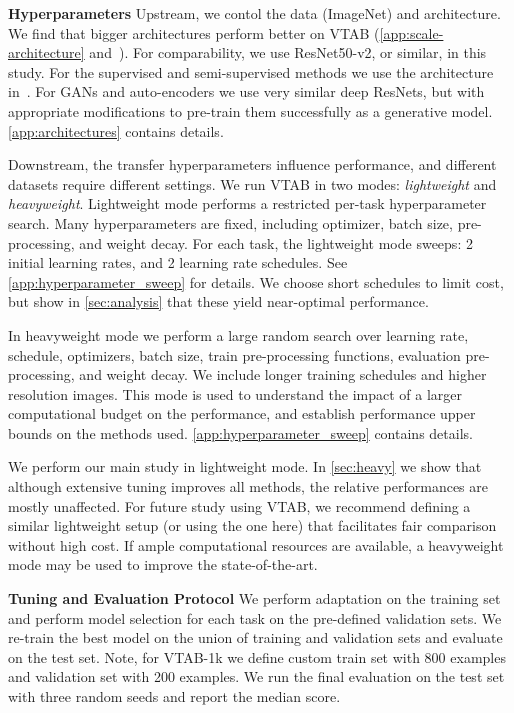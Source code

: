 \textbf{Hyperparameters}\quad
Upstream, we contol the data (ImageNet) and architecture. We find that bigger architectures perform better on VTAB (\ref{app:scale-architecture} and~\citet{kolesnikov2019revisiting}).
For comparability, we use ResNet50-v2, or similar, in this study. For the supervised and semi-supervised methods we use the architecture in~\citet{he2016identity}.
For GANs and auto-encoders we use very similar deep ResNets, but with appropriate modifications to pre-train them successfully as a generative model.
\ref{app:architectures} contains details.

Downstream, the transfer hyperparameters influence performance, and different datasets require different settings. We run VTAB in two modes: \emph{lightweight} and \emph{heavyweight}.
Lightweight mode performs a restricted per-task hyperparameter search. Many hyperparameters are fixed, including optimizer, batch size, pre-processing, and weight decay. For each task, the lightweight mode sweeps: 2 initial learning rates, and 2 learning rate schedules. See \ref{app:hyperparameter_sweep} for details. We choose short schedules to limit cost, but show in \ref{sec:analysis} that these yield near-optimal performance.

In heavyweight mode we perform a large random search over learning rate, schedule, optimizers, batch size, train pre-processing functions, evaluation pre-processing, and weight decay. We include longer training schedules and higher resolution images. This mode is used to understand the impact of a larger computational budget on the performance, and establish performance upper bounds on the methods used.
\ref{app:hyperparameter_sweep} contains details.

We perform our main study in lightweight mode. In \ref{sec:heavy} we show that although extensive tuning improves all methods, the relative performances are mostly unaffected. For future study using VTAB, we recommend defining a similar lightweight setup (or using the one here) that facilitates fair comparison without high cost. If ample computational resources are available, a heavyweight mode may be used to improve the state-of-the-art.

\textbf{Tuning and Evaluation Protocol}\quad
We perform adaptation on the training set and perform model selection for each task on the pre-defined validation sets. We re-train the best model on the union of training and validation sets and evaluate on the test set. Note, for VTAB-1k we define custom train set with 800 examples and validation set with 200 examples. We run the final evaluation on the test set with three random seeds and report the median score.

